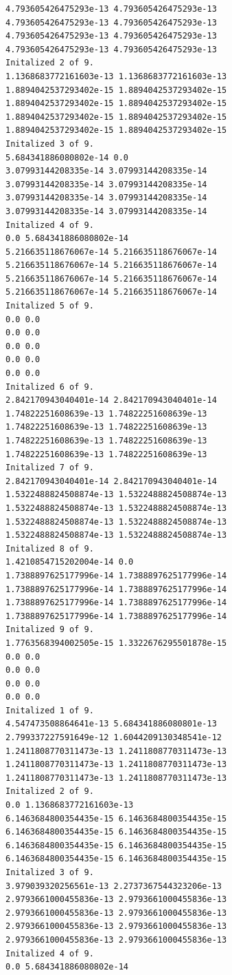\documentclass[11pt]{article}
\begin{document}
    \begin{Verbatim}[commandchars=\\\{\}]
4.793605426475293e-13 4.793605426475293e-13
4.793605426475293e-13 4.793605426475293e-13
4.793605426475293e-13 4.793605426475293e-13
4.793605426475293e-13 4.793605426475293e-13
Initalized 2 of 9.
1.1368683772161603e-13 1.1368683772161603e-13
1.8894042537293402e-15 1.8894042537293402e-15
1.8894042537293402e-15 1.8894042537293402e-15
1.8894042537293402e-15 1.8894042537293402e-15
1.8894042537293402e-15 1.8894042537293402e-15
Initalized 3 of 9.
5.684341886080802e-14 0.0
3.07993144208335e-14 3.07993144208335e-14
3.07993144208335e-14 3.07993144208335e-14
3.07993144208335e-14 3.07993144208335e-14
3.07993144208335e-14 3.07993144208335e-14
Initalized 4 of 9.
0.0 5.684341886080802e-14
5.216635118676067e-14 5.216635118676067e-14
5.216635118676067e-14 5.216635118676067e-14
5.216635118676067e-14 5.216635118676067e-14
5.216635118676067e-14 5.216635118676067e-14
Initalized 5 of 9.
0.0 0.0
0.0 0.0
0.0 0.0
0.0 0.0
0.0 0.0
Initalized 6 of 9.
2.842170943040401e-14 2.842170943040401e-14
1.74822251608639e-13 1.74822251608639e-13
1.74822251608639e-13 1.74822251608639e-13
1.74822251608639e-13 1.74822251608639e-13
1.74822251608639e-13 1.74822251608639e-13
Initalized 7 of 9.
2.842170943040401e-14 2.842170943040401e-14
1.5322488824508874e-13 1.5322488824508874e-13
1.5322488824508874e-13 1.5322488824508874e-13
1.5322488824508874e-13 1.5322488824508874e-13
1.5322488824508874e-13 1.5322488824508874e-13
Initalized 8 of 9.
1.4210854715202004e-14 0.0
1.7388897625177996e-14 1.7388897625177996e-14
1.7388897625177996e-14 1.7388897625177996e-14
1.7388897625177996e-14 1.7388897625177996e-14
1.7388897625177996e-14 1.7388897625177996e-14
Initalized 9 of 9.
1.7763568394002505e-15 1.3322676295501878e-15
0.0 0.0
0.0 0.0
0.0 0.0
0.0 0.0
Initalized 1 of 9.
4.547473508864641e-13 5.684341886080801e-13
2.799337227591649e-12 1.6044209130348541e-12
1.2411808770311473e-13 1.2411808770311473e-13
1.2411808770311473e-13 1.2411808770311473e-13
1.2411808770311473e-13 1.2411808770311473e-13
Initalized 2 of 9.
0.0 1.1368683772161603e-13
6.1463684800354435e-15 6.1463684800354435e-15
6.1463684800354435e-15 6.1463684800354435e-15
6.1463684800354435e-15 6.1463684800354435e-15
6.1463684800354435e-15 6.1463684800354435e-15
Initalized 3 of 9.
3.979039320256561e-13 2.2737367544323206e-13
2.9793661000455836e-13 2.9793661000455836e-13
2.9793661000455836e-13 2.9793661000455836e-13
2.9793661000455836e-13 2.9793661000455836e-13
2.9793661000455836e-13 2.9793661000455836e-13
Initalized 4 of 9.
0.0 5.684341886080802e-14

\end{Verbatim}
\end{document}
